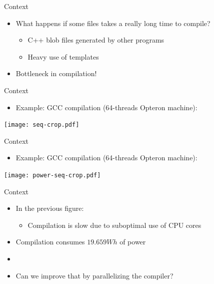 
\begin{frame}{Context}
  \begin{itemize}
    \item What happens if some files takes a really long time to compile?
    \begin{itemize}
        \item C++ blob files generated by other programs
        \item Heavy use of templates
    \end{itemize}
    \item Bottleneck in compilation!
  \end{itemize}
\end{frame}


\begin{frame}{Context}
  \begin{itemize}
    \item Example: GCC compilation (64-threads Opteron machine):
  \end{itemize}

\begin{center}
\texttt{[image: seq-crop.pdf]}
\end{center}
\end{frame}


\begin{frame}{Context}
  \begin{itemize}
    \item Example: GCC compilation (64-threads Opteron machine):
  \end{itemize}

\begin{center}
\texttt{[image: power-seq-crop.pdf]}
\end{center}
\end{frame}


\begin{frame}{Context}
  \begin{itemize}
    \item In the previous figure:
    \begin{itemize}
        \item Compilation is slow due to suboptimal use of CPU cores
    \end{itemize}
    \item Compilation consumes $19.659Wh$ of power
    \item[]
    \item Can we improve that by parallelizing the compiler?
  \end{itemize}

\end{frame}

